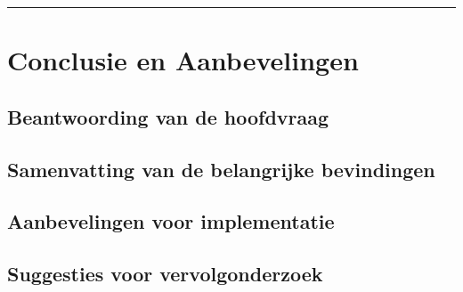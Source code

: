 \vspace{0.2cm}
{\color{gray}\hrule}
\section{Conclusie en Aanbevelingen}





\subsection{Beantwoording van de hoofdvraag}

\subsection{Samenvatting van de belangrijke bevindingen}

\subsection{Aanbevelingen voor implementatie}

\subsection{Suggesties voor vervolgonderzoek}




